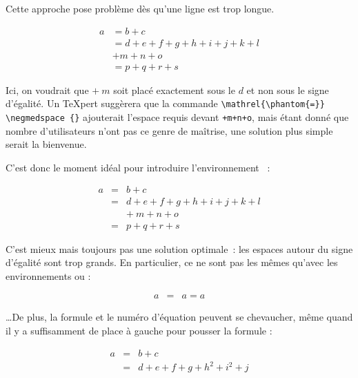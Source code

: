 Cette approche pose problème dès qu'une ligne est trop longue.
\begin{example}
\begin{align}
  a & = b + c \\
  & = d + e + f + g + h + i
  + j + k + l \nonumber \\
  & + m + n + o \\
  & = p + q + r + s
\end{align}
\end{example}
\noindent
Ici, on voudrait que $+\: m$ soit placé exactement sous le $d$ et non sous le
signe d'égalité. Un \TeX{}pert suggèrera que la commande
\verb+\mathrel{\phantom{=}} \negmedspace {}+ ajouterait l'espace
requis devant \verb|+m+n+o|, mais étant donné que nombre
d'utilisateurs n'ont pas ce genre de maîtrise, une solution plus
simple serait la bienvenue.

C'est donc le moment idéal pour introduire l'environnement
~:
\begin{example}
\begin{eqnarray}
  a & = & b + c \\
  & = & d + e + f + g + h + i
  + j + k + l \nonumber \\
  && +\: m + n + o \\
  & = & p + q + r + s
\end{eqnarray}
\end{example}

C'est mieux mais toujours pas une solution optimale~: les
espaces autour du signe d'égalité sont trop grands. En particulier, ce
ne sont pas les mêmes qu'avec les environnements  ou
 :
\begin{example}
\begin{eqnarray}
  a & = & a = a
\end{eqnarray}
\end{example}

\noindent \dots De plus, la formule et le numéro d'équation peuvent se
chevaucher, même quand il y a suffisamment de place à gauche pour
pousser la formule :
\begin{example}
\begin{eqnarray}
  a & = & b + c
  \\
  & = & d + e + f + g + h^2
  + i^2 + j
  \label{eq:eqnarrayfautif}
\end{eqnarray}
\end{example}

